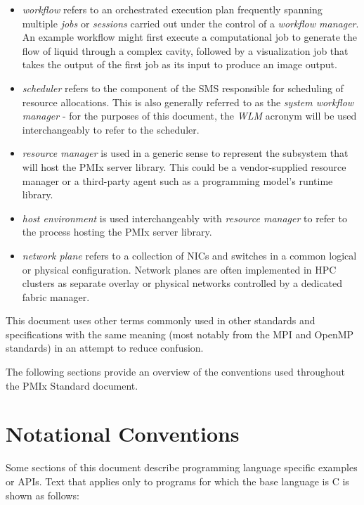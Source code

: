 \begin{itemize}
\item {}\emph{workflow} refers to an orchestrated execution plan frequently spanning multiple \emph{jobs} or \emph{sessions} carried out under the control of a \emph{workflow manager}. An example workflow might first execute a computational job to generate the flow of liquid through a complex cavity, followed by a visualization job that takes the output of the first job as its input to produce an image output.
\item {}\emph{scheduler} refers to the component of the \ac{SMS} responsible for scheduling of resource allocations. This is also generally referred to as the \emph{system workflow manager} - for the purposes of this document, the \emph{WLM} acronym will be used interchangeably to refer to the scheduler.
\item {}\emph{resource manager} is used in a generic sense to represent the subsystem that will host the \ac{PMIx} server library. This could be a vendor-supplied resource manager or a third-party agent such as a programming model's runtime library.
\item {}\emph{host environment} is used interchangeably with \emph{resource manager} to refer to the process hosting the \ac{PMIx} server library.
\item {}\emph{network plane} refers to a collection of \acp{NIC} and switches in a common logical or physical configuration. Network planes are often implemented in \ac{HPC} clusters as separate overlay or physical networks controlled by a dedicated fabric manager.
\end{itemize}


This document uses other terms commonly used in other standards and specifications with the same meaning (most notably from the \ac{MPI} and OpenMP standards) in an attempt to reduce confusion. 

The following sections provide an overview of the conventions used throughout the \ac{PMIx} Standard document.

\section{Notational Conventions}

Some sections of this document describe programming language specific examples or \acp{API}.
Text that applies only to programs for which the base language is C is shown as follows:

